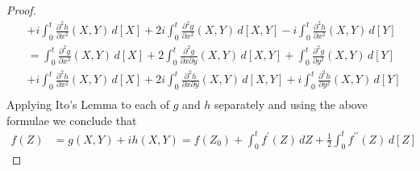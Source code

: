 \begin{proof}
\begin{align*}
&+i \int_0^t \frac {\partial^2 h}{\partial x^2}(X,Y) \, d[X] + 2 i \int_0^t \frac {\partial^2 g}{\partial x^2}(X,Y)  \, d[X,Y] - i \int_0^t \frac {\partial^2 h}{\partial x^2}(X,Y) \, d[Y] \\
&= \int_0^t \frac {\partial^2 g}{\partial x^2}(X,Y) \, d[X] + 2\int_0^t \frac {\partial^2 g}{\partial x \partial y}(X,Y)  \, d[X,Y] + \int_0^t \frac {\partial^2 g}{\partial y^2}(X,Y) \, d[Y] \\ 
&+i \int_0^t \frac {\partial^2 h}{\partial x^2}(X,Y) \, d[X] + 2 i \int_0^t \frac {\partial^2 h}{\partial x \partial y}(X,Y)  \, d[X,Y] + i \int_0^t \frac {\partial^2 h}{\partial y^2}(X,Y) \, d[Y] \\
\end{align*}
Applying Ito's Lemma to each of $g$ and $h$ separately and using the above formulae we conclude that 
\begin{align*}
f(Z) &= g(X,Y) + ih(X,Y) = f(Z_0) + \int_0^t f^{\prime}(Z) \, dZ + \frac{1}{2}\int_0^t f^{\prime \prime}(Z) \, d[Z]
\end{align*}
\end{proof}

